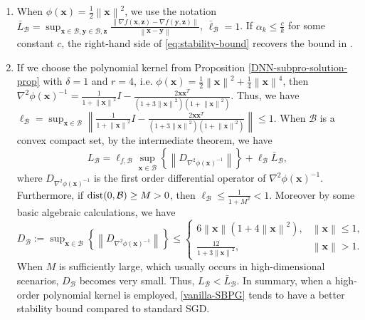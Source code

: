 \documentclass[twoside,11pt]{article}
\newcommand{\cB}{\mathcal B}
\def\norm#1{\left\|#1\right\|}
\def\vx{{\bm{x}}}
\def\vy{{\bm{y}}}
\def\vz{{\bm{z}}}
\begin{document}
{\begin{remark}
\begin{enumerate}
    \item When $\phi(\vx)=\frac{1}{2}\norm{\vx}^2$, we use the notation $\bar L_{\cB}=\sup_{\vx\in\cB,\vy\in\cB,\vz}\frac{\norm{\nabla f(\vx,\vz)-\nabla f(\vy,\vz)}}{\norm{\vx-\vy}}$, $\bar\ell_\cB=1$.
    If $\alpha_k\leq\frac{c}{k}$ for some constant $c$, the right-hand side of \eqref{eq:stability-bound} recovers the bound in \cite[Theorem 3.12]{hardt2016train}. 
    \item If we choose the polynomial kernel from Proposition \ref{DNN-subpro-solution-prop} with $\delta=1$ and $r=4$, i.e. $\phi(\vx)=\frac{1}{2}\norm{\vx}^2+\frac{1}{4}\norm{\vx}^4$, then $\nabla^2\phi(\vx)^{-1}=\frac{1}{1+\norm{\vx}^2}I-\frac{2\vx\vx^T}{(1+3\norm{\vx}^2)(1+\norm{\vx}^2)}$. Thus, we have $\ell_{\cB}=\sup_{\vx\in\cB}\norm{\frac{1}{1+\norm{\vx}^2}I-\frac{2\vx\vx^T}{(1+3\norm{\vx}^2)(1+\norm{\vx}^2)}}\leq1$. When $\cB$ is a convex compact set, by the intermediate theorem, we have
    \[
    L_{\cB}=\ell_{f,\cB}\sup_{\vx\in\cB}\left\{\norm{D_{\nabla^2\phi(\vx)^{-1}}}\right\}+\ell_{\cB}\bar L_{\cB},
    \]
    where $D_{\nabla^2\phi(\vx)^{-1}}$ is the first order differential operator of $\nabla^2\phi(\vx)^{-1}$. Furthermore, if ${\rm dist}(0,\cB)\geq M>0$, then $\ell_{\cB}\leq\frac{1}{1+M^2}<1$. Moreover by some basic algebraic calculations, we have $D_{\cB}:=\sup_{\vx\in\cB}\left\{\norm{D_{\nabla^2\phi(\vx)^{-1}}}\right\}\leq\left\{\begin{array}{cc}
        6\norm{\vx}(1+4\norm{\vx}^2), & \norm{\vx}\leq1, \\
        \frac{12}{1+3\norm{\vx}^2}, & \norm{\vx}>1.
    \end{array}\right.$ When $M$ is sufficiently large, which usually occurs in high-dimensional scenarios, $D_{\cB}$ becomes very small. Thus, $L_{\cB}<\bar L_{\cB}$. In summary, when a high-order polynomial kernel is employed, \eqref{vanilla-SBPG} tends to have a better stability bound compared to standard SGD.
     
\end{enumerate}
\end{remark}
}
\end{document}

